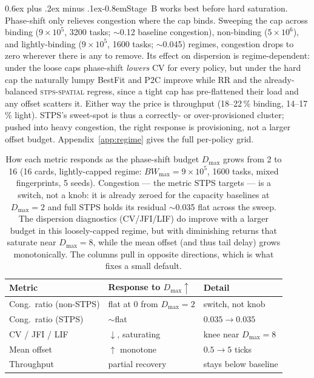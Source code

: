 \documentclass[letterpaper,twocolumn,10pt]{article}
\makeatletter
\newcommand{\tightparagraph}{\@startsection{paragraph}{4}{\z@}%
    {0.6ex plus .2ex minus .1ex}{-0.8em}{\normalfont\normalsize\bfseries}}
\makeatother
\begin{document}
\tightparagraph{Stage~B works best before hard saturation.} Phase-shift only relieves congestion where the cap binds. Sweeping the cap across binding ($9\!\times\!10^{5}$, 3200 tasks; $\sim$0.12 baseline congestion), non-binding ($5\!\times\!10^{6}$), and lightly-binding ($9\!\times\!10^{5}$, 1600 tasks; $\sim$0.045) regimes, congestion drops to zero wherever there is any to remove. Its effect on dispersion is regime-dependent: under the loose caps phase-shift \emph{lowers} CV for every policy, but under the hard cap the naturally lumpy BestFit and P2C improve while RR and the already-balanced \textsc{stps-spatial} regress, since a tight cap has pre-flattened their load and any offset scatters it. Either way the price is throughput (18--22\,\% binding, 14--17\,\% light). STPS's sweet-spot is thus a correctly- or over-provisioned cluster; pushed into heavy congestion, the right response is provisioning, not a larger offset budget. Appendix~\ref{app:regime} gives the full per-policy grid.

\begin{table}[t]
\centering
\caption{How each metric responds as the phase-shift budget $D_{\max}$ grows from 2 to 16 (16 cards, lightly-capped regime: $BW_{\max}\!=\!9\!\times\!10^{5}$, 1600 tasks, mixed fingerprints, 5 seeds). Congestion --- the metric STPS targets --- is a switch, not a knob: it is already zeroed for the capacity baselines at $D_{\max}\!=\!2$ and full STPS holds its residual $\sim$0.035 flat across the sweep. The dispersion diagnostics (CV/JFI/LIF) do improve with a larger budget in this loosely-capped regime, but with diminishing returns that saturate near $D_{\max}\!=\!8$, while the mean offset (and thus tail delay) grows monotonically. The columns pull in opposite directions, which is what fixes a small default.}
\label{tab:q2_dmax}
\small
\begin{tabular}{lll}
\toprule
Metric & Response to $D_{\max}\!\uparrow$ & Detail \\
\midrule
Cong.\ ratio (non-STPS) & flat at 0 from $D_{\max}\!=\!2$ & switch, not knob \\
Cong.\ ratio (STPS)     & $\sim$flat & $0.035\!\to\!0.035$ \\
CV / JFI / LIF      & $\downarrow$, saturating & knee near $D_{\max}\!=\!8$ \\
Mean offset              & $\uparrow$ monotone & $0.5\!\to\!5$ ticks \\
Throughput               & partial recovery & stays below baseline \\
\bottomrule
\end{tabular}
\end{table}
\end{document}
